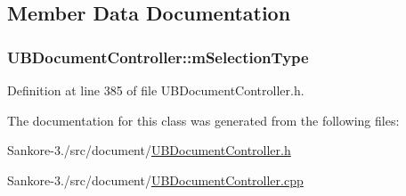 \subsection{Member Data Documentation}
\hypertarget{class_u_b_document_controller_a5dff5d4455f06313db9c053c641da7dc}{
\subsubsection[{m\-Selection\-Type}]{ U\-B\-Document\-Controller\-::m\-Selection\-Type\hspace{0.3cm}{\ttfamily [protected]}}}\label{d6/de0/class_u_b_document_controller_a5dff5d4455f06313db9c053c641da7dc}


Definition at line 385 of file U\-B\-Document\-Controller.\-h.



The documentation for this class was generated from the following files\-:\begin{DoxyCompactItemize}
\item 
Sankore-\/3./src/document/\hyperlink{_u_b_document_controller_8h}{U\-B\-Document\-Controller.\-h}\item 
Sankore-\/3./src/document/\hyperlink{_u_b_document_controller_8cpp}{U\-B\-Document\-Controller.\-cpp}\end{DoxyCompactItemize}
